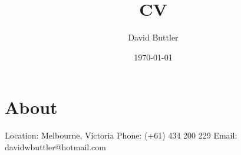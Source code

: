 \documentclass[a4paper]{article}
\title{CV}
\author{David Buttler}
\date{\today}
\begin{document}
	\maketitle
	\section*{About}
	Location: Melbourne, Victoria\newline
	Phone: (+61) 434 200 229\newline
	Email: davidwbuttler@hotmail.com
\end{document}
